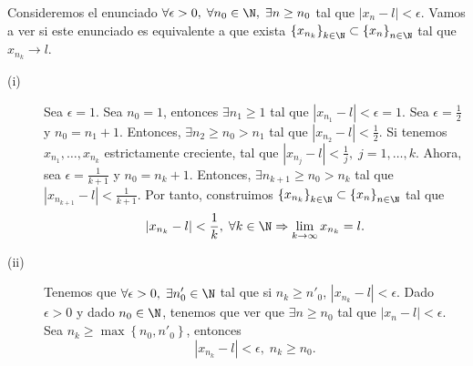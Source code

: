 \begin{eg}
	\normalfont Consideremos el enunciado $\displaystyle \forall \epsilon > 0, \; \forall n_{0} \in \N, \; \exists n \geq n_{0} $ tal que $\displaystyle \left|x_{n}-l\right|<\epsilon  $. Vamos a ver si este enunciado es equivalente a que exista $\displaystyle \left\{ x_{n_{k}}\right\} _{k\in\N}\subset \left\{ x_{n}\right\} _{n\in\N} $ tal que $\displaystyle x_{n_{k}}\to l $. 
\begin{description}
	\item[(i)] Sea $\displaystyle \epsilon = 1 $. Sea $\displaystyle n_{0} = 1 $, entonces $\displaystyle \exists n_{1} \geq 1 $ tal que $\displaystyle \left|x_{n_{1}}-l\right|<\epsilon = 1  $. Sea $\displaystyle \epsilon = \frac{1}{2} $ y $\displaystyle n_{0} = n_{1} + 1 $. Entonces, $\displaystyle \exists n_{2} \geq n_{0} > n_{1} $ tal que $\displaystyle \left|x_{n_{2}}-l\right|<\frac{1}{2} $. Si tenemos $\displaystyle x_{n_{1}}, \ldots, x_{n_{k}} $ estrictamente creciente, tal que $\displaystyle \left|x_{n_{j}}-l\right|<\frac{1}{j}, \; j = 1, \ldots, k $. Ahora, sea $\displaystyle \epsilon = \frac{1}{k+1} $ y $\displaystyle n_{0} = n_{k} + 1 $. Entonces, $\displaystyle \exists n_{k+1}\geq n_{0} > n_{k} $ tal que $\displaystyle \left|x_{n_{k+1}}-l\right|<\frac{1}{k+1} $. Por tanto, construimos $\displaystyle \left\{ x_{n_{k}}\right\} _{k\in\N}\subset \left\{ x_{n}\right\} _{n\in\N} $ tal que 
	\[ \left|x_{n_{k}}-l\right|<\frac{1}{k}, \; \forall k \in \N \Rightarrow \lim_{k \to \infty}x_{n_{k}} = l .\]
\item[(ii)] Tenemos que $\displaystyle \forall \epsilon > 0, \; \exists n'_{0} \in \N  $ tal que si $\displaystyle n_{k} \geq n'_{0} $, $\displaystyle \left|x_{n_{k}}-l\right|<\epsilon  $. Dado $\displaystyle \epsilon > 0 $ y dado $\displaystyle n_{0} \in \N $, tenemos que ver que $\displaystyle \exists n\geq n_{0} $ tal que $\displaystyle \left|x_{n}-l\right|<\epsilon  $. Sea $\displaystyle n_{k} \geq \max \left\{ n_{0}, n'_{0}\right\}  $, entonces
	\[ \left|x_{n_{k}}-l\right|<\epsilon, \; n_{k} \geq n_{0} .\]
\end{description}
\end{eg}
